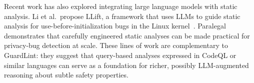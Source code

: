 Recent work has also explored integrating large language models with static analysis. Li et al.\ propose LLift, a framework that uses LLMs to guide static analysis for use-before-initialization bugs in the Linux kernel~\cite{static_analysis_llm}. Paralegal~\cite{paralegal_static_analysis_privacy_bugs} demonstrates that carefully engineered static analyses can be made practical for privacy-bug detection at scale. These lines of work are complementary to GuardLint: they suggest that query-based analyses expressed in CodeQL or similar languages can serve as a foundation for richer, possibly LLM-augmented reasoning about subtle safety properties.
